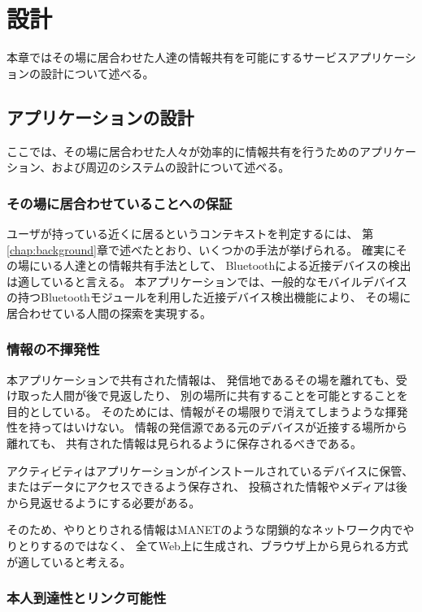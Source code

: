 \chapter{設計}\label{chap:design}

本章ではその場に居合わせた人達の情報共有を可能にするサービスアプリケーションの設計について述べる。

\newpage

\section{アプリケーションの設計}

ここでは、その場に居合わせた人々が効率的に情報共有を行うためのアプリケーション、および周辺のシステムの設計について述べる。


\subsection{その場に居合わせていることへの保証}

ユーザが持っている近くに居るというコンテキストを判定するには、
第\ref{chap:background}章で述べたとおり、いくつかの手法が挙げられる。
確実にその場にいる人達との情報共有手法として、
Bluetoothによる近接デバイスの検出は適していると言える。
本アプリケーションでは、一般的なモバイルデバイスの持つBluetoothモジュールを利用した近接デバイス検出機能により、
その場に居合わせている人間の探索を実現する。


\subsection{情報の不揮発性}

本アプリケーションで共有された情報は、
発信地であるその場を離れても、受け取った人間が後で見返したり、
別の場所に共有することを可能とすることを目的としている。
そのためには、情報がその場限りで消えてしまうような揮発性を持ってはいけない。
情報の発信源である元のデバイスが近接する場所から離れても、
共有された情報は見られるように保存されるべきである。

アクティビティはアプリケーションがインストールされているデバイスに保管、
またはデータにアクセスできるよう保存され、
投稿された情報やメディアは後から見返せるようにする必要がある。

そのため、やりとりされる情報はMANETのような閉鎖的なネットワーク内でやりとりするのではなく、
全てWeb上に生成され、ブラウザ上から見られる方式が適していると考える。


\subsection{本人到達性とリンク可能性}

